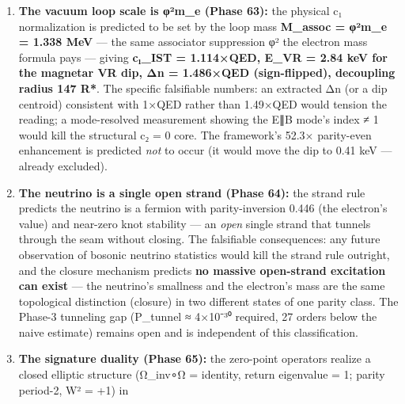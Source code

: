 \documentclass[
]{article}
\begin{document}
\begin{enumerate}
{  angles} (the ordinary-polarization mode is non-refractive) while the
  E⊥B mode carries the c₁ shift (16c₁B²sin²θ). Mode-resolved magnetar
  polarimetry that measures the two mode indices separately (or the 2--4
  keV vacuum-resonance structure at the precision that distinguishes a
  one-mode from a two-mode splitting) tests this directly; the magnitude
  claim that scales with c₁ = α/φ² (52.3×QED) is \emph{predicted to be
  excluded} by the observed 2--4 keV VR dip location --- the data pin c₁
  to near-QED strength, so a future derivation of the physical c₁
  normalization that returns a large enhancement would be in direct
  tension with IXPE.
\item
  \textbf{The vacuum loop scale is φ²m\_e (Phase 63):} the physical c₁
  normalization is predicted to be set by the loop mass \textbf{M\_assoc
  = φ²m\_e = 1.338 MeV} --- the same associator suppression φ² the
  electron mass formula pays --- giving \textbf{c₁\_IST = 1.114×QED,
  E\_VR = 2.84 keV for the magnetar VR dip, \textbar Δn\textbar{} =
  1.486×QED (sign-flipped), decoupling radius 147 R*}. The specific
  falsifiable numbers: an extracted \textbar Δn\textbar{} (or a dip
  centroid) consistent with 1×QED rather than 1.49×QED would tension the
  reading; a mode-resolved measurement showing the E∥B mode's index ≠ 1
  would kill the structural c₂ = 0 core. The framework's 52.3×
  parity-even enhancement is predicted \emph{not} to occur (it would
  move the dip to 0.41 keV --- already excluded).
\item
  \textbf{The neutrino is a single open strand (Phase 64):} the strand
  rule predicts the neutrino is a fermion with parity-inversion 0.446
  (the electron's value) and near-zero knot stability --- an \emph{open}
  single strand that tunnels through the seam without closing. The
  falsifiable consequences: any future observation of bosonic neutrino
  statistics would kill the strand rule outright, and the closure
  mechanism predicts \textbf{no massive open-strand excitation can
  exist} --- the neutrino's smallness and the electron's mass are the
  same topological distinction (closure) in two different states of one
  parity class. The Phase-3 tunneling gap (P\_tunnel ≈ 4×10⁻³⁰ required,
  27 orders below the naive estimate) remains open and is independent of
  this classification.
\item
  \textbf{The signature duality (Phase 65):} the zero-point operators
  realize a closed elliptic structure (Ω\_inv∘Ω = identity,
  \textbar return eigenvalue\textbar{} = 1; parity period-2, W² = +1) in

\end{enumerate}
\end{document}

